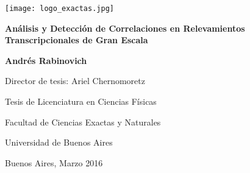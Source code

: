 \thispagestyle{empty}

\begin {center}

\texttt{[image: logo\_exactas.jpg]}

\vspace{5cm}

\textbf{\large Análisis y Detección de Correlaciones en Relevamientos Transcripcionales de Gran Escala}

\vspace{1cm}

\textbf{Andrés Rabinovich}

\vspace{1.5cm}

Director de tesis: Ariel Chernomoretz

\vspace{8cm}

Tesis de Licenciatura en Ciencias Físicas

Facultad de Ciencias Exactas y Naturales

Universidad de Buenos Aires

\vspace{1cm}

Buenos Aires, Marzo 2016

\end {center}
